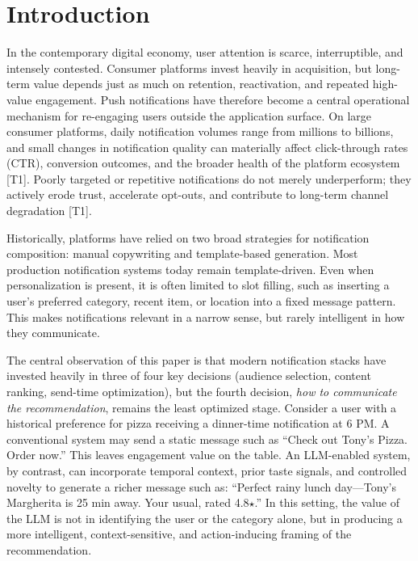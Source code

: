 \documentclass[sigconf]{acmart}
\begin{document}


\maketitle

\section{Introduction}

In the contemporary digital economy, user attention is scarce, interruptible, and intensely contested. Consumer platforms invest heavily in acquisition, but long-term value depends just as much on retention, reactivation, and repeated high-value engagement. Push notifications have therefore become a central operational mechanism for re-engaging users outside the application surface. On large consumer platforms, daily notification volumes range from millions to billions, and small changes in notification quality can materially affect click-through rates (CTR), conversion outcomes, and the broader health of the platform ecosystem \cite{bie2026pushgen} [T1]. Poorly targeted or repetitive notifications do not merely underperform; they actively erode trust, accelerate opt-outs, and contribute to long-term channel degradation \cite{ohly2023effects} [T1].

Historically, platforms have relied on two broad strategies for notification composition: manual copywriting and template-based generation. Most production notification systems today remain template-driven. Even when personalization is present, it is often limited to slot filling, such as inserting a user’s preferred category, recent item, or location into a fixed message pattern. This makes notifications relevant in a narrow sense, but rarely intelligent in how they communicate. 

The central observation of this paper is that modern notification stacks have invested heavily in three of four key decisions (audience selection, content ranking, send-time optimization), but the fourth decision, \textit{how to communicate the recommendation}, remains the least optimized stage. Consider a user with a historical preference for pizza receiving a dinner-time notification at 6 PM. A conventional system may send a static message such as ``Check out Tony's Pizza. Order now.'' This leaves engagement value on the table. An LLM-enabled system, by contrast, can incorporate temporal context, prior taste signals, and controlled novelty to generate a richer message such as: ``Perfect rainy lunch day---Tony's Margherita is 25 min away. Your usual, rated 4.8$\star$.'' In this setting, the value of the LLM is not in identifying the user or the category alone, but in producing a more intelligent, context-sensitive, and action-inducing framing of the recommendation.
\end{document}
